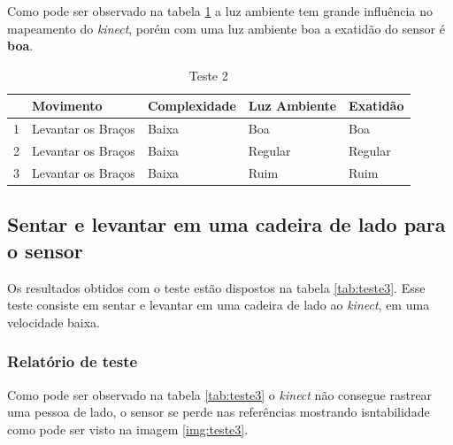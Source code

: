 Como pode ser observado na tabela \ref{tab:teste2} a luz ambiente tem grande influência no mapeamento do \textit{kinect}, porém com uma luz ambiente boa
a exatidão do sensor é \textbf{boa}.

\begin{table}[H]
\centering
\caption{Teste 2}
\label{tab:teste2}
\begin{tabular}{@{}|c|c|l|l|l|@{}}
\toprule
\multicolumn{1}{|l|}{ } & \multicolumn{1}{l|}{\textbf{Movimento}} & \textbf{Complexidade} & \textbf{Luz Ambiente} & \textbf{Exatidão} \\ \midrule
1                                 & Levantar os  Braços                     & Baixa                 & Boa                   & Boa               \\ \midrule
2                                 & Levantar os  Braços                     & Baixa                 & Regular               & Regular           \\ \midrule
3                                 & Levantar os  Braços                     & Baixa                 & Ruim                  & Ruim              \\ \bottomrule
\end{tabular}
\end{table}


\subsection{Sentar e levantar em uma cadeira de lado para o sensor}\label{sub:teste3}
Os resultados obtidos com o teste estão dispostos na tabela \ref{tab:teste3}. Esse teste consiste em sentar e levantar em uma cadeira de lado ao \textit{kinect}, em uma velocidade
baixa.

\subsubsection{Relatório de teste}\label{sub:relteste3}
Como pode ser observado na tabela \ref{tab:teste3} o \textit{kinect} não consegue rastrear uma pessoa de lado, o sensor se perde nas referências mostrando isntabilidade como pode ser
visto na imagem \ref{img:teste3}.


